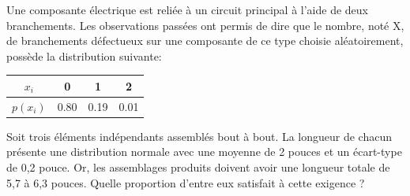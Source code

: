 \begin{questions}
\begin{parts}
   
 \end{parts}



\newpage
\question
Une composante électrique est reliée à un circuit principal à l’aide de deux branchements. Les observations passées ont permis de dire que le 
nombre, noté X, de branchements défectueux sur une composante de 
ce type choisie aléatoirement, possède la distribution suivante:
\begin{center}
\begin{tabular}{ c|ccc } 
 $x_i$ & 0 & 1 & 2 \\  \hline
 $p(x_i)$ & 0.80 & 0.19 & 0.01 \\ 
\end{tabular}

\end{center}

\newpage
\question[8]
Soit trois éléments indépendants assemblés bout à bout. La longueur de chacun présente une 
distribution normale avec une moyenne de 2 pouces et un écart-type de 0,2 pouce. Or, les assemblages produits doivent avoir une longueur totale de 5,7 à 6,3 pouces. Quelle proportion d’entre eux satisfait à cette exigence ?


\end{questions}
